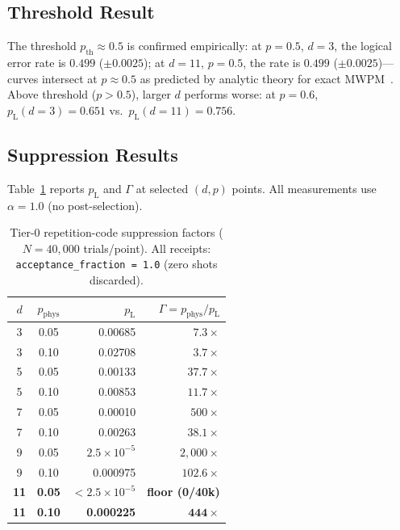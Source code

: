 \documentclass[conference]{IEEEtran}
\providecommand{\measuredFrom}[1]{}
\newcommand{\pL}{p_{\mathrm{L}}}    %
\newcommand{\pP}{p_{\mathrm{phys}}} %
\newcommand{\pth}{p_{\mathrm{th}}}  %
\newcommand{\af}{\alpha}            %
\newcommand{\suppfactor}{\Gamma}    %
\begin{document}
\subsection{Threshold Result}
\measuredFrom{.ai-ecosystem/scripts/quantum-scaleup/receipts/2026-06-15_qec-threshold-repetition.ndjson}

The threshold $\pth \approx 0.5$ is confirmed empirically: at $p = 0.5$,
$d = 3$, the logical error rate is $0.499$ ($\pm 0.0025$); at $d = 11$,
$p = 0.5$, the rate is $0.499$ ($\pm 0.0025$)---curves intersect at
$p \approx 0.5$ as predicted by analytic theory for exact
MWPM~\cite{dennis2002topological}. Above threshold ($p > 0.5$), larger
$d$ performs worse: at $p = 0.6$, $\pL(d{=}3) = 0.651$ vs.\
$\pL(d{=}11) = 0.756$.

\subsection{Suppression Results}

Table~\ref{tab:suppression} reports $\pL$ and $\suppfactor$ at selected
$(d, p)$ points. All measurements use $\af = 1.0$ (no post-selection).

\begin{table}[t]
\caption{Tier-0 repetition-code suppression factors ($N{=}40{,}000$ trials/point).
All receipts: \texttt{acceptance\_fraction = 1.0} (zero shots discarded).}
\label{tab:suppression}
\small
\measuredFrom{.ai-ecosystem/scripts/quantum-scaleup/receipts/2026-06-15_qec-threshold-repetition.ndjson}
\begin{tabular}{@{}ccrr@{}}
\toprule
$d$ & $\pP$ & $\pL$ & $\suppfactor = \pP/\pL$ \\
\midrule
3 & 0.05 & 0.00685 & $7.3\times$ \\
3 & 0.10 & 0.02708 & $3.7\times$ \\
5 & 0.05 & 0.00133 & $37.7\times$ \\
5 & 0.10 & 0.00853 & $11.7\times$ \\
7 & 0.05 & 0.00010 & $500\times$ \\
7 & 0.10 & 0.00263 & $38.1\times$ \\
9 & 0.05 & $2.5 \times 10^{-5}$ & $2{,}000\times$ \\
9 & 0.10 & 0.000975 & $102.6\times$ \\
\textbf{11} & \textbf{0.05} & $\mathbf{<}2.5 \times 10^{-5}$ & \textbf{floor (0/40k)} \\
\textbf{11} & \textbf{0.10} & \textbf{0.000225} & $\mathbf{444\times}$ \\
\bottomrule
\end{tabular}
\end{table}
\end{document}
